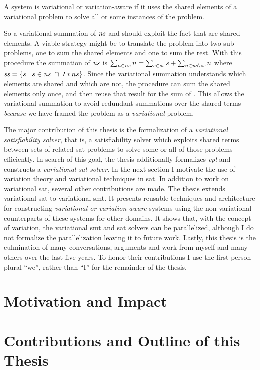 \begin{definition}
  A system is variational or variation-aware if it uses the shared elements of a
  variational problem to solve all or some instances of the problem.
\end{definition}
%
So a variational summation of $\mathit{ns}$ and  should exploit the fact
that  are shared elements. A viable strategy might be to translate
the problem into two sub-problems, one to sum the shared elements and one to sum
the rest. With this procedure the summation of $\mathit{ns}$ is $\sum_{n \in{} ns} n
= \sum_{s \in{} \mathit{ss}} s + \sum_{n \in{} \mathit{ns} \setminus{} \mathit{ss}} n$ where
$\kf{ss} = \setc{s}{s \in{} \kf{ns}\ \cap{}\ \prime*{ns}}$. Since the
variational summation understands which elements are shared and which are not,
the procedure can sum the shared elements only once, and then reuse that result
for the sum of . This allows the variational summation to avoid
redundant summations over the shared terms \emph{because} we have framed the
problem as a \emph{variational} problem.

The major contribution of this thesis is the formalization of a
\emph{variational satisfiability solver}, that is, a satisfiability solver which
exploits shared terms between sets of related \acl{sat} problems to solve some
or all of those problems efficiently. In search of this goal, the thesis
additionally formalizes \emph{\acl{vpl}} and constructs a \emph{variational
  \ac{sat} solver}. In the next section I motivate the use of variation theory
and variational techniques in \acl{sat}. In addition to work on variational
\ac{sat}, several other contributions are made. The thesis extends variational
\acl{sat} to variational \ac{smt}. It presents reusable techniques and
architecture for constructing \emph{variational or variation-aware} systems
using the non-variational counterparts of these systems for other domains. It
shows that, with the concept of variation, the variational \ac{smt} and \ac{sat}
solvers can be parallelized, although I do not formalize the parallelization
leaving it to future work. Lastly, this thesis is the culmination of many
conversations, arguments and work from myself and many others over the last five
years. To honor their contributions I use the first-person plural ``we'', rather
than ``I'' for the remainder of the thesis.

\section{Motivation and Impact}


\section{Contributions and Outline of this Thesis}


